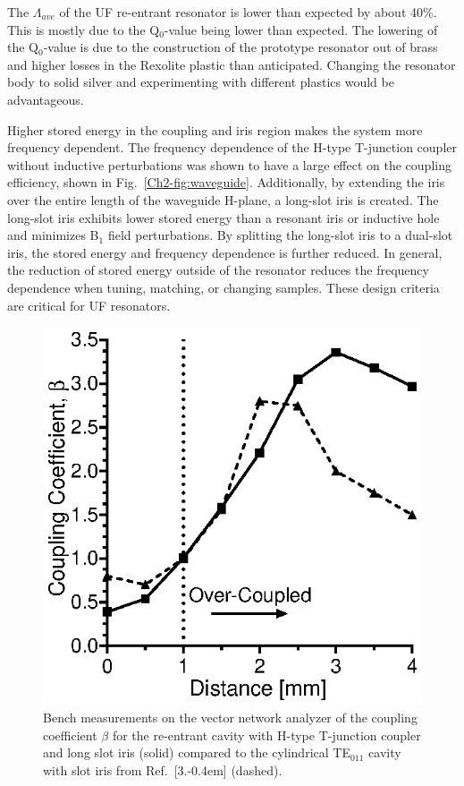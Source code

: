 The $\Lambda_{ave}$ of the UF re-entrant \cylTE{} resonator is lower than expected by about 40\%. This is mostly due to the Q$_0$-value being lower than expected. The lowering of the Q$_0$-value is due to the construction of the prototype resonator out of brass and higher losses in the Rexolite plastic than anticipated. Changing the resonator body to solid silver and experimenting with different plastics would be advantageous. 

Higher stored energy in the coupling and iris region makes the system more frequency dependent. The frequency dependence of the H-type T-junction coupler without inductive perturbations was shown to have a large effect on the coupling efficiency, shown in Fig.~\ref{Ch2-fig:waveguide}. Additionally, by extending the iris over the entire length of the waveguide H-plane, a long-slot iris is created. \cite{Mett2009} The long-slot iris exhibits lower stored energy than a resonant iris or inductive hole and minimizes B$_1$ field perturbations. By splitting the long-slot iris to a dual-slot iris, the stored energy and frequency dependence is further reduced. In general, the reduction of stored energy outside of the resonator reduces the frequency dependence when tuning, matching, or changing samples. These design criteria are critical for UF resonators. 

\begin{figure}[htp]\centering
 \includegraphics{Kapitel/Ch2-Images/08-couplingcoeff.eps}
 \caption[Bench measurements of the coupling coefficient.]{Bench measurements on the vector network analyzer of the coupling coefficient $\beta$  for the re-entrant \cylTE{} cavity with H-type T-junction coupler and long slot iris (solid) compared to the cylindrical TE$_{011}$ cavity with slot iris from Ref.~[3.\kern-0.4em] (dashed).}
 \label{Ch2-fig:coupling}
\end{figure}

